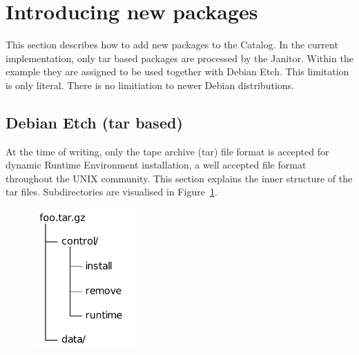 \section{Introducing new packages}\label{sec:catalog}

This section describes how to add new packages to the Catalog. In the current implementation, only tar based packages are processed by the Janitor.
Within the example they are assigned to be used together with Debian Etch. This limitation is only literal. 
There is no limitiation to newer Debian distributions.

\subsection{Debian Etch (tar based)}

At the time of writing, only the tape archive (tar) file format is accepted for dynamic Runtime Environment installation, 
a well accepted file format throughout the UNIX community. This section explains the inner structure of the tar files. 
Subdirectories are visualised in Figure~\ref{fig:tar_folder}.

\begin{figure}
  \begin{center}
    \includegraphics[width=4cm]{images/tar_folder.pdf}
    \label{fig:tar_folder}
  \end{center}
\end{figure}

